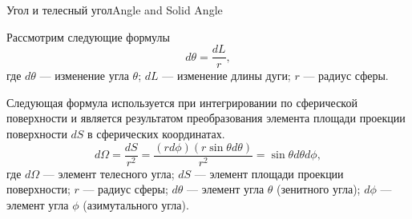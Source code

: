 \documentclass{beamer}
\begin{document}
	\begin{frame}{Угол и телесный угол}{Angle and Solid Angle}

		Рассмотрим следующие формулы
		\[
			d \theta = \frac{d L}{r}	
		,
		\]
		где
		\(d\theta\) --- изменение угла \(\theta\);
		\(dL\) --- изменение длины дуги;
		\(r\) --- радиус сферы.
		

		Следующая формула используется при интегрировании по сферической поверхности и является результатом преобразования элемента площади проекции поверхности \(dS\) в сферических координатах.
		\[
			d \Omega = \frac{dS}{r^2} 
			= 
			\frac{(r d \phi)(r \sin \theta d \theta)}{r^2} 
			= 
			\sin \theta  d \theta d \phi
			,
		\]
		где
		\(d\Omega\) --- элемент телесного угла;
		\(dS\) --- элемент площади проекции поверхности;
		\(r\) --- радиус сферы;
		\(d\theta\) --- элемент угла \(\theta\) (зенитного угла);
		\(d\phi\) --- элемент угла \(\phi\) (азимутального угла).
		

	\end{frame}
\end{document}
